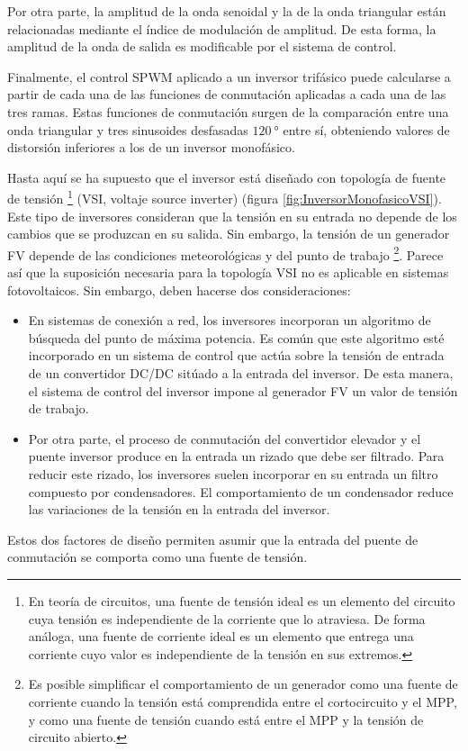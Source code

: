 Por otra parte, la amplitud de la onda senoidal y la de la onda triangular
están relacionadas mediante el índice de modulación de amplitud. De
esta forma, la amplitud de la onda de salida es modificable por el
sistema de control.

Finalmente, el control SPWM aplicado a un inversor trifásico puede
calcularse a partir de cada una de las funciones de conmutación aplicadas
a cada una de las tres ramas. Estas funciones de conmutación surgen
de la comparación entre una onda triangular y tres sinusoides desfasadas
$\SI{120}{\degree}$ entre sí, obteniendo valores de distorsión inferiores
a los de un inversor monofásico. 

Hasta aquí se ha supuesto que el inversor está diseñado con topología
de fuente de tensión%
\footnote{En teoría de circuitos, una fuente de tensión ideal es un elemento
del circuito cuya tensión es independiente de la corriente que lo
atraviesa. De forma análoga, una fuente de corriente ideal es un elemento
que entrega una corriente cuyo valor es independiente de la tensión
en sus extremos.%
} (VSI, voltaje source inverter) (figura \ref{fig:InversorMonofasicoVSI}).
Este tipo de inversores consideran que la tensión en su entrada no
depende de los cambios que se produzcan en su salida. Sin embargo,
la tensión de un generador FV depende de las condiciones meteorológicas
y del punto de trabajo%
\footnote{Es posible simplificar el comportamiento de un generador como una
fuente de corriente cuando la tensión está comprendida entre el cortocircuito
y el MPP, y como una fuente de tensión cuando está entre el MPP y
la tensión de circuito abierto.%
}. Parece así que la suposición necesaria para la topología VSI no
es aplicable en sistemas fotovoltaicos. Sin embargo, deben hacerse
dos consideraciones:
\begin{itemize}
\item En sistemas de conexión a red, los inversores incorporan un algoritmo
de búsqueda del punto de máxima potencia. Es común que este algoritmo
esté incorporado en un sistema de control que actúa sobre la tensión
de entrada de un convertidor DC/DC sitúado a la entrada del inversor.
De esta manera, el sistema de control del inversor impone al generador
FV un valor de tensión de trabajo. 
\item Por otra parte, el proceso de conmutación del convertidor elevador
y el puente inversor produce en la entrada un rizado que debe ser
filtrado. Para reducir este rizado, los inversores suelen incorporar
en su entrada un filtro compuesto por condensadores. El comportamiento
de un condensador reduce las variaciones de la tensión en la entrada
del inversor.
\end{itemize}
Estos dos factores de diseño permiten asumir que la entrada del puente
de conmutación se comporta como una fuente de tensión. 

